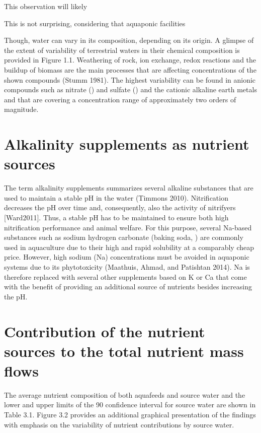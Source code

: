\documentclass[preprint, 3p,
authoryear]{elsarticle} %
\begin{document}
This observation will likely

This is not surprising, considering that aquaponic facilities

Though, water can vary in its composition, depending on its origin. A
glimpse of the extent of variability of terrestrial waters in their
chemical composition is provided in Figure 1.1. Weathering of rock, ion
exchange, redox reactions and the buildup of biomass are the main
processes that are affecting concentrations of the shown compounds
(Stumm 1981). The highest variability can be found in anionic compounds
such as nitrate () and sulfate () and the cationic
alkaline earth metals  and  that are covering a
concentration range of approximately two orders of magnitude.

\hypertarget{alkalinity-supplements-as-nutrient-sources}{%
\section{Alkalinity supplements as nutrient
sources}\label{alkalinity-supplements-as-nutrient-sources}}

The term alkalinity supplements summarizes several alkaline substances
that are used to maintain a stable pH in the water (Timmons 2010).
Nitrification decreases the pH over time and, consequently, also the
activity of nitrifyers {[}Ward2011{]}. Thus, a stable pH has to be
maintained to ensure both high nitrification performance and animal
welfare. For this purpose, several Na-based substances such as sodium
hydrogen carbonate (baking soda, ) are commonly used in
aquaculture due to their high and rapid solubility at a comparably cheap
price. However, high sodium (Na) concentrations must be avoided in
aquaponic systems due to its phytotoxicity (Maathuis, Ahmad, and
Patishtan 2014). Na is therefore replaced with several other supplements
based on K or Ca that come with the benefit of providing an additional
source of nutrients besides increasing the pH.

\hypertarget{contribution-of-the-nutrient-sources-to-the-total-nutrient-mass-flows}{%
\section{Contribution of the nutrient sources to the total nutrient mass
flows}\label{contribution-of-the-nutrient-sources-to-the-total-nutrient-mass-flows}}

The average nutrient composition of both aquafeeds and source water and
the lower and upper limits of the \SI{90}{\p} confidence interval for
source water are shown in Table 3.1. Figure 3.2 provides an additional
graphical presentation of the findings with emphasis on the variability
of nutrient contributions by source water.
\end{document}
